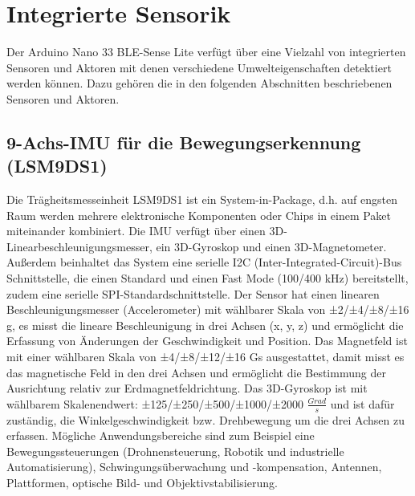 \section{Integrierte Sensorik}
Der Arduino Nano 33 BLE-Sense Lite verfügt über eine Vielzahl von integrierten Sensoren und Aktoren mit denen verschiedene Umwelteigenschaften detektiert werden können. Dazu gehören die in den folgenden Abschnitten beschriebenen Sensoren und Aktoren.
\subsection{9-Achs-IMU für die Bewegungserkennung (LSM9DS1)}
	Die Trägheitsmesseinheit LSM9DS1 ist ein System-in-Package, d.h. auf engsten Raum werden mehrere elektronische Komponenten oder Chips in einem Paket miteinander kombiniert.\cite{Wagner.2013} Die IMU verfügt über einen 3D-Linearbeschleunigungsmesser, ein 3D-Gyroskop und einen 3D-Magnetometer. Außerdem beinhaltet das System eine serielle I2C (Inter-Integrated-Circuit)-Bus Schnittstelle, die einen Standard und einen Fast Mode (100/400 kHz) bereitstellt, zudem eine serielle SPI-Standardschnittstelle. Der Sensor hat einen linearen Beschleunigungsmesser (Accelerometer) mit wählbarer Skala von ±2/±4/±8/±16 g, es misst die lineare Beschleunigung in drei Achsen (x, y, z) und ermöglicht die Erfassung von Änderungen der Geschwindigkeit und Position. Das Magnetfeld ist mit einer wählbaren Skala von ±4/±8/±12/±16 Gs ausgestattet, damit misst es das magnetische Feld in den drei Achsen und ermöglicht die Bestimmung der Ausrichtung relativ zur Erdmagnetfeldrichtung. Das 3D-Gyroskop ist mit wählbarem Skalenendwert: ±125/±250/±500/±1000/±2000 $\frac{Grad}{s}$ und ist dafür zuständig, die Winkelgeschwindigkeit bzw. Drehbewegung um die drei Achsen zu erfassen.\cite{STM1.2015}\cite{Ard.2024}
Mögliche Anwendungsbereiche sind zum Beispiel eine Bewegungssteuerungen (Drohnensteuerung, Robotik und industrielle Automatisierung), Schwingungsüberwachung und -kompensation, Antennen, Plattformen, optische Bild- und Objektivstabilisierung.  


